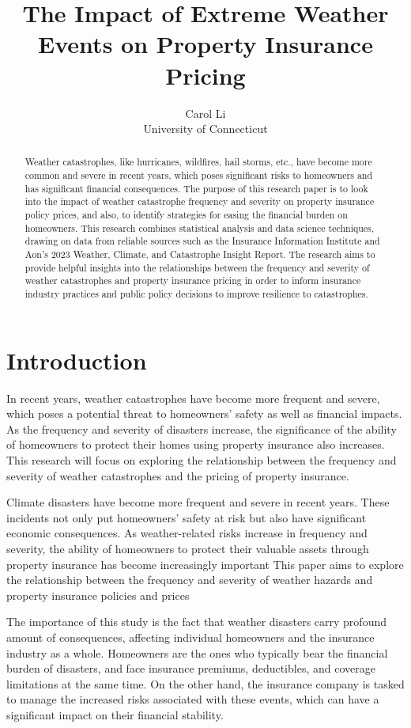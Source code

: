 \documentclass[12pt]{article}
\title{The Impact of Extreme Weather Events on Property Insurance Pricing}
\author{Carol Li\\
    University of Connecticut
}
\begin{document}
\maketitle

\begin{abstract}
Weather catastrophes, like hurricanes, wildfires, hail storms, etc., have become more common and severe in recent years, which poses 
significant risks to homeowners and has significant financial consequences. The purpose of this research paper is to look into the 
impact of weather catastrophe frequency and severity on property insurance policy prices, and also, to identify strategies for easing 
the financial burden on homeowners. This research combines statistical analysis and data science techniques, drawing on data from 
reliable sources such as the Insurance Information Institute and Aon's 2023 Weather, Climate, and Catastrophe Insight Report. The 
research aims to provide helpful insights into the relationships between the frequency and severity of weather catastrophes and 
property insurance pricing in order to inform insurance industry practices and public policy decisions to improve resilience to 
catastrophes.
\end{abstract}


\section{Introduction}
\label{sec:intro}
In recent years, weather catastrophes have become more frequent and severe, which poses a potential threat to homeowners' safety as 
well as financial impacts. As the frequency and severity of disasters increase, the significance of the ability of homeowners to 
protect their homes using property insurance also increases. This research will focus on exploring the relationship between the 
frequency and severity of weather catastrophes and the pricing of property insurance.

Climate disasters have become more frequent and severe in recent years. These incidents not only put homeowners' safety at risk but 
also have significant economic consequences. As weather-related risks increase in frequency and severity, the ability of homeowners to 
protect their valuable assets through property insurance has become increasingly important This paper aims to explore the relationship 
between the frequency and severity of weather hazards and property insurance policies and prices

The importance of this study is the fact that weather disasters carry profound amount of consequences, affecting individual homeowners 
and the insurance industry as a whole. Homeowners are the ones who typically bear the financial burden of disasters, and face 
insurance premiums, deductibles, and coverage limitations at the same time. On the other hand, the insurance company is tasked to 
manage the increased risks associated with these events, which can have a significant impact on their financial stability.
\end{document}
